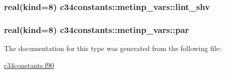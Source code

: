 \subsubsection[{\texorpdfstring{lint\+\_\+shv}{lint_shv}}]{\setlength{\rightskip}{0pt plus 5cm}real(kind=8) c34constants\+::metinp\+\_\+vars\+::lint\+\_\+shv}\hypertarget{structc34constants_1_1metinp__vars_a8cf66324715d983f7b618d876099090c}{}\label{structc34constants_1_1metinp__vars_a8cf66324715d983f7b618d876099090c}
\subsubsection[{\texorpdfstring{par}{par}}]{\setlength{\rightskip}{0pt plus 5cm}real(kind=8) c34constants\+::metinp\+\_\+vars\+::par}\hypertarget{structc34constants_1_1metinp__vars_a5d75984acca70974ff8c6bd53628f1d0}{}\label{structc34constants_1_1metinp__vars_a5d75984acca70974ff8c6bd53628f1d0}


The documentation for this type was generated from the following file\+:\begin{DoxyCompactItemize}
\item 
\hyperlink{c34constants_8f90}{c34constants.\+f90}\end{DoxyCompactItemize}
